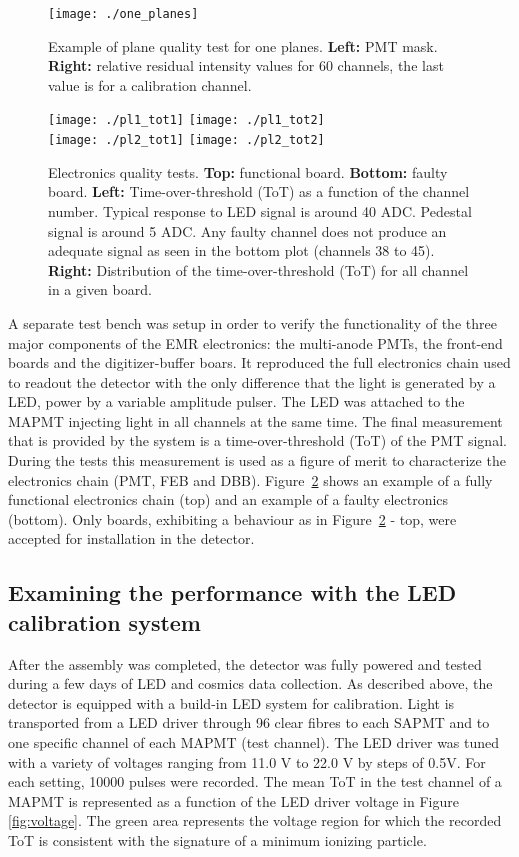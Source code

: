 \documentclass[a4paper,11pt]{article}
\begin{document}
\begin{figure}[htb]
 \centering
 \texttt{[image: ./one\_planes]}
 \caption[Example of plane quality tests]{Example of plane quality test for one planes. {\bf Left:} PMT mask. {\bf Right:} relative residual intensity
 values for 60 channels, the last value is for a calibration channel.}
 \label{fig:plane_tests_one_planes}
\end{figure}


\begin{figure}[htb]
 \centering
 \texttt{[image: ./pl1\_tot1]}
 \texttt{[image: ./pl1\_tot2]}\\
 \texttt{[image: ./pl2\_tot1]}
 \texttt{[image: ./pl2\_tot2]}
 \caption[Electronics quality tests]{Electronics quality tests. {\bf Top:} functional board. {\bf Bottom:} faulty board. {\bf Left:}
 Time-over-threshold (ToT) as a function of the channel number. Typical response to LED signal is around 40 ADC. Pedestal signal is around 5 ADC. Any
 faulty channel does not produce an adequate signal as seen in the bottom plot (channels 38 to 45). {\bf Right:} Distribution of the time-over-threshold 
 (ToT) for all channel in a given board.}
 \label{fig:tot_feb_dbb_test}
\end{figure}

A separate test bench was setup in order to verify the functionality of the three major components of the EMR electronics: the multi-anode PMTs, the 
front-end boards and the digitizer-buffer boars. It reproduced the full electronics chain used to readout the detector with the only difference that the
light is generated by a LED, power by a variable amplitude pulser. The LED was attached to the MAPMT injecting light in all channels at the same time.
The final measurement that is provided by the system is a time-over-threshold (ToT) of the PMT signal. During the tests this measurement is used as a
figure of merit to characterize the electronics chain (PMT, FEB and DBB). Figure~\ref{fig:tot_feb_dbb_test} shows an example of a fully functional
electronics chain (top) and an example of a faulty electronics (bottom). Only boards, exhibiting a behaviour as in Figure~\ref{fig:tot_feb_dbb_test}
- top, were accepted for installation in the detector.

\subsection{Examining the performance with the LED calibration system}\label{sec:cosmic_perf}
After the assembly was completed, the detector was fully powered and tested during a few days of LED and cosmics data collection. As described above,
the detector is equipped with a build-in LED system for calibration.  Light is transported from a LED driver through 96 clear fibres to each SAPMT and to
one specific channel of each MAPMT (test channel). The LED driver was tuned with a variety of voltages ranging from 11.0 V to 22.0 V by steps of 0.5V. For
each setting, 10000 pulses were recorded. The mean ToT in the test channel of a MAPMT is represented as a function of the LED driver voltage in Figure
\ref{fig:voltage}. The green area represents the voltage region for which the recorded ToT is consistent with the signature of a minimum ionizing particle.
\end{document}
